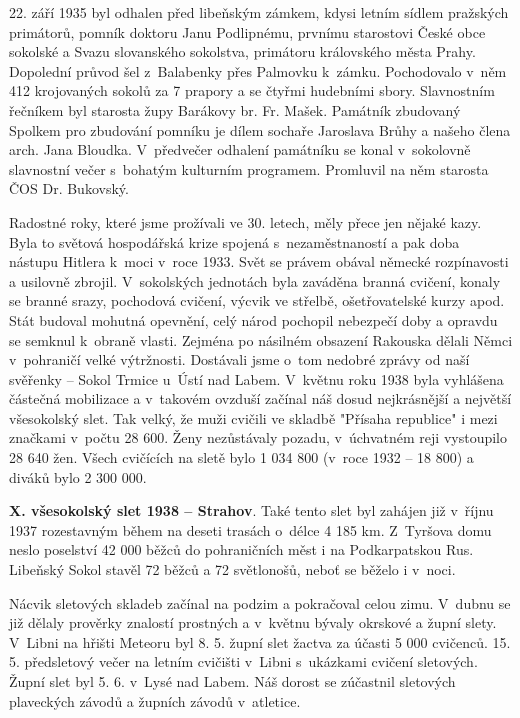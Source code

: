 \documentclass[a5paper, 11pt, twoside]{article}
\begin{document}
22. září 1935 byl odhalen před libeňským zámkem, kdysi letním sídlem
pražských primátorů, pomník doktoru Janu Podlipnému, prvnímu starostovi
České obce sokolské a Svazu slovanského sokolstva, primátoru královského
města Prahy. Dopolední průvod šel z~Balabenky přes Palmovku k~zámku.
Pochodovalo v~něm 412 krojovaných sokolů za 7 prapory a se čtyřmi
hudebními sbory. Slavnostním řečníkem byl starosta župy Barákovy br. Fr.
Mašek. Památník zbudovaný Spolkem pro zbudování pomníku je dílem sochaře
Jaroslava Brůhy a našeho člena arch. Jana Bloudka. V~předvečer odhalení
památníku se konal v~sokolovně slavnostní večer s~bohatým kulturním
programem. Promluvil na něm starosta ČOS Dr. Bukovský.

Radostné roky, které jsme prožívali ve 30. letech, měly přece jen nějaké
kazy. Byla to světová hospodářská krize spojená s~nezaměstnaností a pak
doba nástupu Hitlera k~moci v~roce 1933. Svět se právem obával německé
rozpínavosti a usilovně zbrojil. V~sokolských jednotách byla zaváděna
branná cvičení, konaly se branné srazy, pochodová cvičení, výcvik ve
střelbě, ošetřovatelské kurzy apod. Stát budoval mohutná opevnění, celý
národ pochopil nebezpečí doby a opravdu se semknul k~obraně vlasti.
Zejména po násilném obsazení Rakouska dělali Němci v~pohraničí velké
výtržnosti. Dostávali jsme o~tom nedobré zprávy od naší svěřenky --
Sokol Trmice u~Ústí nad Labem. V~květnu roku 1938 byla vyhlášena
částečná mobilizace a v~takovém ovzduší začínal náš dosud nejkrásnější a
největší všesokolský slet. Tak velký, že muži cvičili ve skladbě
"Přísaha republice" i mezi značkami v~počtu 28 600. Ženy nezůstávaly
pozadu, v~úchvatném reji vystoupilo 28 640 žen. Všech cvičících na sletě
bylo 1 034 800 (v~roce 1932 -- 18 800) a diváků bylo 2 300 000.

\textbf{X. všesokolský slet 1938 -- Strahov}. Také tento slet byl zahájen již v~říjnu 1937 rozestavným během na deseti
trasách o~délce 4 185 km. Z~Tyršova domu neslo poselství 42 000 běžců do
pohraničních měst i na Podkarpatskou Rus. Libeňský Sokol stavěl 72 běžců
a 72 světlonošů, neboť se běželo i v~noci.

Nácvik sletových skladeb začínal na podzim a pokračoval celou zimu.
V~dubnu se již dělaly prověrky znalostí prostných a v~květnu bývaly
okrskové a župní slety. V~Libni na hřišti Meteoru byl 8. 5. župní slet
žactva za účasti 5 000 cvičenců. 15. 5. předsletový večer na letním
cvičišti v~Libni s~ukázkami cvičení sletových. Župní slet byl 5. 6.
v~Lysé nad Labem. Náš dorost se zúčastnil sletových plaveckých závodů a
župních závodů v~atletice.
\end{document}

